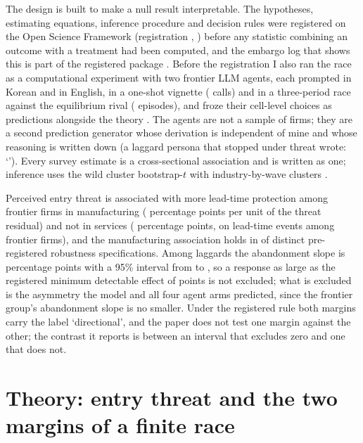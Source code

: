 \documentclass[preprint,12pt,authoryear]{elsarticle}
\begin{document}
The design is built to make a null result interpretable. The hypotheses, estimating equations, inference procedure and decision rules were registered on the Open Science Framework (registration \OSFRegistrationId, \OSFRegisteredDate) before any statistic combining an outcome with a treatment had been computed, and the embargo log that shows this is part of the registered package \citep{nosek2018preregistration,weston2019recommendations}. Before the registration I also ran the race as a computational experiment with two frontier LLM agents, each prompted in Korean and in English, in a one-shot vignette (\StageACalls{} calls) and in a three-period race against the equilibrium rival (\StageBEpisodes{} episodes), and froze their cell-level choices as predictions alongside the theory \citep{horton2023large,manning2024automated}. The agents are not a sample of firms; they are a second prediction generator whose derivation is independent of mine and whose reasoning is written down (a laggard persona that stopped under threat wrote: `\ExReasonStopFirst'). Every survey estimate is a cross-sectional association and is written as one; inference uses the wild cluster bootstrap-$t$ with industry-by-wave clusters \citep{cameron2008bootstrap}.

Perceived entry threat is associated with more lead-time protection among frontier firms in manufacturing (\RobManuHOnePp{} percentage points per unit of the threat residual) and not in services (\RobServHOnePp{} percentage points, on \SecGapPreEventsServTwo{} lead-time events among \SecGapNServTwo{} frontier firms), and the manufacturing association holds in \RobHOneDistinctSigCount{} of \RobHOneDistinctSpecCount{} distinct pre-registered robustness specifications. Among laggards the abandonment slope is \KISHTwoPp{} percentage points with a 95\% interval from \KISHTwoLoPp{} to \KISHTwoHiPp, so a response as large as the registered minimum detectable effect of \MDEQuitPp{} points is not excluded; what is excluded is the asymmetry the model and all four agent arms predicted, since the frontier group's abandonment slope is no smaller. Under the registered rule both margins carry the label `directional', and the paper does not test one margin against the other; the contrast it reports is between an interval that excludes zero and one that does not.

\section{Theory: entry threat and the two margins of a finite race}
\label{sec:theory}
\end{document}
